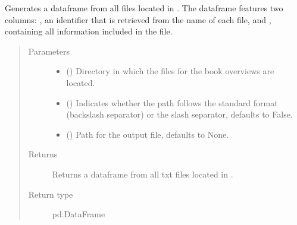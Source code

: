 \documentclass[letterpaper,10pt,english]{sphinxmanual}
\begin{document}
\begin{fulllineitems}
\label{\detokenize{code:code_utils.utils.generate_dataframe_from_sparse_txts}}
Generates a dataframe from all  files located in . The dataframe 
features two columns: , an identifier that is retrieved from the name of
each  file, and , containing all information included in the  file.
\begin{quote}\begin{description}
\item[{Parameters}] \leavevmode\begin{itemize}
\item {} 
 () \textendash{} Directory in which the  files for the book overviews
are located.

\item {} 
 (\sphinxstyleliteralemphasis{\sphinxupquote{, }}) \textendash{} Indicates whether the path follows the standard
format (backslash separator) or the slash separator, defaults to False.

\item {} 
 (\sphinxstyleliteralemphasis{\sphinxupquote{, }}) \textendash{} Path for the output file, defaults to None.

\end{itemize}

\item[{Returns}] \leavevmode
Returns a dataframe from all txt files located in .

\item[{Return type}] \leavevmode
pd.DataFrame

\end{description}\end{quote}

\end{fulllineitems}
\end{document}
